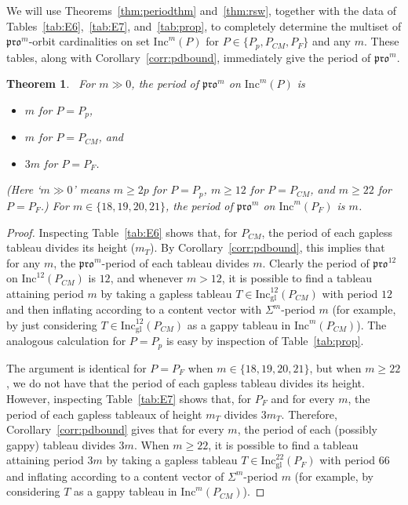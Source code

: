 \documentclass[12pt]{amsart}
\newtheorem{theorem}{Theorem}[section]
\theoremstyle{definition}
\theoremstyle{remark}
\numberwithin{equation}{section}
\newcommand{\inc}{\ensuremath{\mathrm{Inc}}}
\newcommand{\incgl}{\inc_{\mathrm{gl}}}
\newcommand{\pro}{\mathfrak{pro}}
\begin{document}
 
We will use Theorems~\ref{thm:periodthm} and~\ref{thm:rsw}, together with the data of Tables~\ref{tab:E6},~\ref{tab:E7}, and~\ref{tab:prop}, to completely determine the multiset of $\pro^m$-orbit cardinalities on set $\inc^m(P)$ for $P \in \{P_p, P_{CM}, P_F \}$ and any $m$. These tables, along with Corollary~\ref{corr:pdbound}, immediately give the period of $\pro^m$.
\\
\begin{theorem}~\label{thm:actualpdbound}
For $m \gg 0$, the period of $\pro^m$ on $\inc^m(P)$ is 
\begin{itemize}
\item $m$ for $P = P_p$, 
\item $m$ for $P = P_{CM}$, and 
\item $3m$ for $P = P_F$. 
\end{itemize}
(Here `$m \gg 0$' means $m \geq 2p$ for $P = P_p$, $m \geq 12$ for $P = P_{CM}$, and $m \geq 22$ for $P = P_F$.) For $m \in \lbrace 18,19,20, 21 \rbrace$, the period of $\pro^m$ on $\inc^m(P_F)$ is $m$.
\end{theorem}
\begin{proof}
Inspecting Table~\ref{tab:E6} shows that, for $P_{CM}$, the period of each gapless tableau  divides its height ($m_T$). By Corollary~\ref{corr:pdbound}, this implies that for any $m$, the $\pro^m$-period of each tableau divides $m$. Clearly the period of $\pro^{12}$ on $\inc^{12}(P_{CM})$ is $12$, and whenever $m> 12$, it is possible to find a tableau attaining period $m$ by taking a gapless tableau $T \in \incgl^{12}(P_{CM})$ with period $12$ and then inflating according to a content vector with $\Sigma^m$-period $m$ (for example, by just considering $T \in \incgl^{12}(P_{CM})$ as a gappy tableau in $\inc^m(P_{CM})$). The analogous calculation for $P = P_p$ is easy by inspection of Table~\ref{tab:prop}.

The argument is identical for $P = P_F$ when $m \in \lbrace 18,19,20, 21 \rbrace$, but when $m \geq 22$, we do not have that the period of each gapless tableau divides its height. However, inspecting Table~\ref{tab:E7} shows that, for $P_F$ and for every $m$, the period of each gapless tableaux of height $m_T$ divides $3m_T$. Therefore, Corollary~\ref{corr:pdbound} gives that for every $m$, the period of each (possibly gappy) tableau divides $3m$. When $m \geq 22$, it is possible to find a tableau attaining period $3m$ by taking a gapless tableau  $T \in \incgl^{22}(P_F)$ with period $66$ and inflating according to a content vector of $\Sigma^m$-period $m$ (for example, by considering $T$ as a gappy tableau in $\inc^m(P_{CM})$).
\end{proof}
\end{document}
